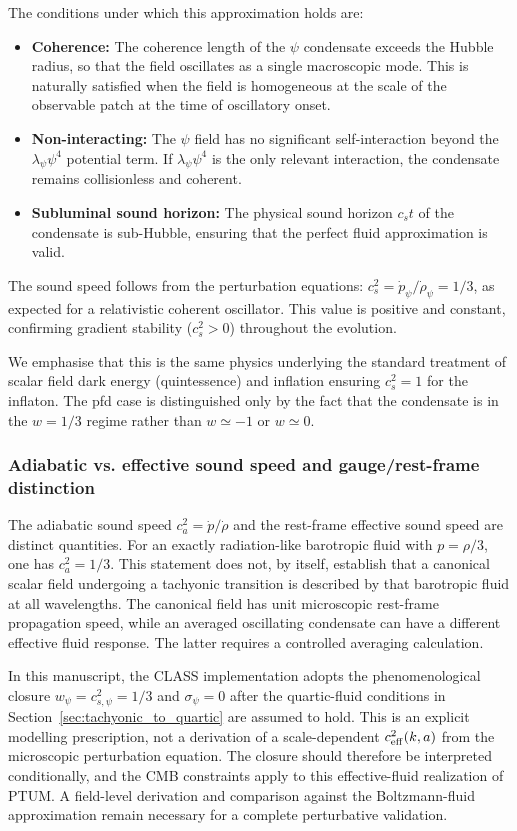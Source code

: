 \documentclass[epj]{svjour}
\begin{document}
The conditions under which this approximation holds are:
\begin{itemize}
\item \textbf{Coherence:} The coherence length of the $\psi$
condensate exceeds the Hubble radius, so that the field oscillates as
a single macroscopic mode. This is naturally satisfied when the
field is homogeneous at the scale of the observable patch at the time
of oscillatory onset.
\item \textbf{Non-interacting:} The $\psi$ field has no significant
self-interaction beyond the $\lambda_\psi\psi^4$ potential term.
If $\lambda_\psi\psi^4$ is the only relevant interaction, the
condensate remains collisionless and coherent.
\item \textbf{Subluminal sound horizon:} The physical sound horizon
$c_s t$ of the condensate is sub-Hubble, ensuring that the perfect
fluid approximation is valid.
\end{itemize}

The sound speed follows from the perturbation equations:
$c_s^2=\dot p_\psi/\dot\rho_\psi=1/3$, as expected for a
relativistic coherent oscillator. This value is positive and
constant, confirming gradient stability ($c_s^2>0$) throughout the
evolution.

We emphasise that this is the same physics underlying the standard
treatment of scalar field dark energy (quintessence) and inflation
ensuring $c_s^2=1$ for the inflaton. The pfd case is distinguished
only by the fact that the condensate is in the $w=1/3$ regime rather
than $w\simeq-1$ or $w\simeq0$.

\subsubsection{Adiabatic vs. effective sound speed and gauge/rest-frame distinction}

The adiabatic sound speed $c_a^2=\dot p/\dot\rho$ and the rest-frame
effective sound speed are distinct quantities. For an exactly
radiation-like barotropic fluid with $p=\rho/3$, one has
$c_a^2=1/3$. This statement does not, by itself, establish that a
canonical scalar field undergoing a tachyonic transition is described
by that barotropic fluid at all wavelengths. The canonical field has
unit microscopic rest-frame propagation speed, while an averaged
oscillating condensate can have a different effective fluid response.
The latter requires a controlled averaging calculation.

In this manuscript, the CLASS implementation adopts the phenomenological
closure $w_\psi=c_{s,\psi}^2=1/3$ and $\sigma_\psi=0$ after the
quartic-fluid conditions in Section~\ref{sec:tachyonic_to_quartic}
are assumed to hold. This is an explicit modelling prescription, not
a derivation of a scale-dependent $c_{\rm eff}^2(k,a)$ from the
microscopic perturbation equation. The closure should therefore be
interpreted conditionally, and the CMB constraints apply to this
effective-fluid realization of PTUM. A field-level derivation and
comparison against the Boltzmann-fluid approximation remain necessary
for a complete perturbative validation.
\end{document}
